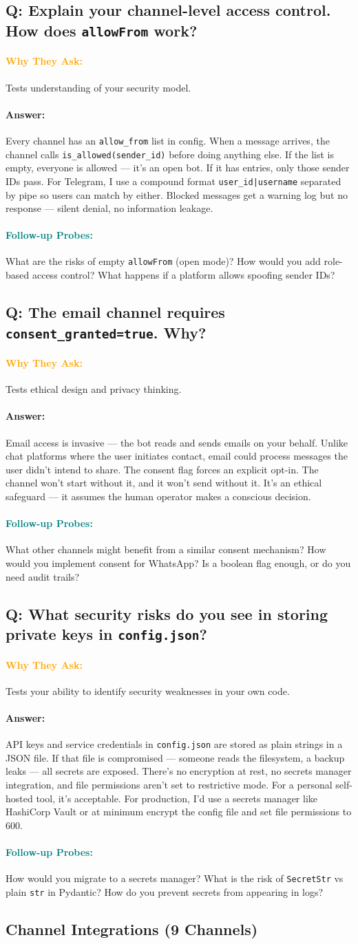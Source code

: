 \documentclass[11pt,a4paper]{article}
\newcommand{\Q}[1]{\subsection{#1}}
\newcommand{\Ans}[1]{\paragraph{\textbf{Answer:}} #1}
\newcommand{\Why}{\paragraph{\textcolor{orange}{\textbf{Why They Ask:}}}}
\newcommand{\Probe}{\paragraph{\textcolor{teal}{\textbf{Follow-up Probes:}}}}
\begin{document}
\Q{Q: Explain your channel-level access control. How does \texttt{allowFrom} work?}
\Why Tests understanding of your security model.
\Ans Every channel has an \texttt{allow\_from} list in config. When a message arrives, the channel calls \texttt{is\_allowed(sender\_id)} before doing anything else. If the list is empty, everyone is allowed --- it's an open bot. If it has entries, only those sender IDs pass. For Telegram, I use a compound format \texttt{user\_id|username} separated by pipe so users can match by either. Blocked messages get a warning log but no response --- silent denial, no information leakage.
\Probe What are the risks of empty \texttt{allowFrom} (open mode)? How would you add role-based access control? What happens if a platform allows spoofing sender IDs?

\Q{Q: The email channel requires \texttt{consent\_granted=true}. Why?}
\Why Tests ethical design and privacy thinking.
\Ans Email access is invasive --- the bot reads and sends emails on your behalf. Unlike chat platforms where the user initiates contact, email could process messages the user didn't intend to share. The consent flag forces an explicit opt-in. The channel won't start without it, and it won't send without it. It's an ethical safeguard --- it assumes the human operator makes a conscious decision.
\Probe What other channels might benefit from a similar consent mechanism? How would you implement consent for WhatsApp? Is a boolean flag enough, or do you need audit trails?

\Q{Q: What security risks do you see in storing private keys in \texttt{config.json}?}
\Why Tests your ability to identify security weaknesses in your own code.
\Ans API keys and service credentials in \texttt{config.json} are stored as plain strings in a JSON file. If that file is compromised --- someone reads the filesystem, a backup leaks --- all secrets are exposed. There's no encryption at rest, no secrets manager integration, and file permissions aren't set to restrictive mode. For a personal self-hosted tool, it's acceptable. For production, I'd use a secrets manager like HashiCorp Vault or at minimum encrypt the config file and set file permissions to 600.
\Probe How would you migrate to a secrets manager? What is the risk of \texttt{SecretStr} vs plain \texttt{str} in Pydantic? How do you prevent secrets from appearing in logs?

\subsection{Channel Integrations (9 Channels)}
\end{document}

